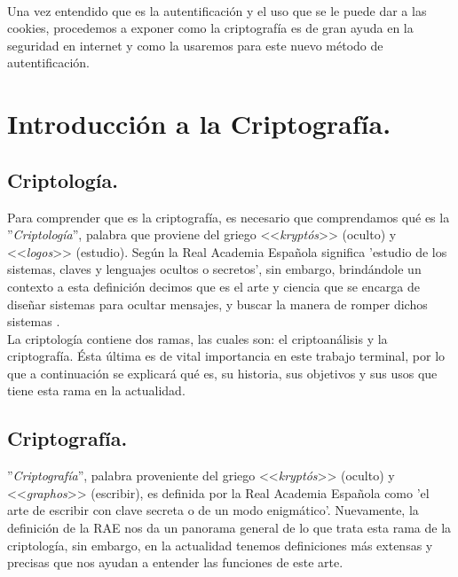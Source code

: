 \documentclass[12pt, a4paper, titlepage]{report}
\begin{document}
		\paragraph{}
		Una vez entendido que es la autentificación y el uso que se le puede dar a las cookies, procedemos a exponer como la criptografía es de gran ayuda en la seguridad en internet y como la usaremos para este nuevo método de autentificación.
		
		
	    \section{Introducción a la Criptografía.}
	        \subsection{Criptología.}
	            Para comprender que es la criptografía, es necesario que comprendamos qué es la ''\textit{Criptología}'', palabra que proviene del griego <<\textit{kryptós}>> (oculto) y <<\textit{logos}>> (estudio). Según la Real Academia Española significa 'estudio de los sistemas, claves y lenguajes ocultos o secretos', sin embargo, brindándole un contexto a esta definición decimos que es el arte y ciencia que se encarga de diseñar sistemas para ocultar mensajes, y buscar la manera de romper dichos sistemas \cite{refCriptology}.\\
	            La criptología contiene dos ramas, las cuales son: el criptoanálisis y la criptografía. Ésta última es de vital importancia en este trabajo terminal, por lo que a continuación se explicará qué es, su historia, sus objetivos y sus usos que tiene esta rama en la actualidad.
            \subsection{Criptografía.}
                ''\textit{Criptografía}'', palabra proveniente del griego <<\textit{kryptós}>> (oculto) y <<\textit{graphos}>> (escribir), es definida por la Real Academia Española como 'el arte de escribir con clave secreta o de un modo enigmático'. Nuevamente, la definición de la RAE nos da un panorama general de lo que trata esta rama de la criptología, sin embargo, en la actualidad tenemos definiciones más extensas y precisas que nos ayudan a entender las funciones de este arte.\\
                
\end{document}
